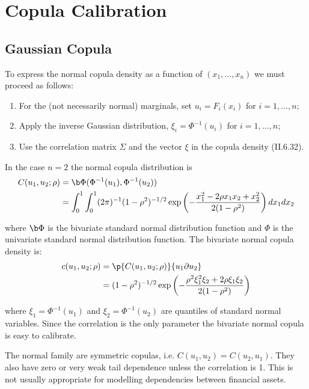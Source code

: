 \section{Copula Calibration}

\subsection{Gaussian Copula}
To express the normal copula density as a function of $(x_1, \ldots, x_n)$ we must proceed as follows:

\begin{enumerate}
    \item For the (not necessarily normal) marginals, set $u_i = F_i(x_i)$ for $i = 1, \ldots, n$;
    \item Apply the inverse Gaussian distribution, $\xi_i = \Phi^{-1}(u_i)$ for $i = 1, \ldots, n$;
    \item Use the correlation matrix $\Sigma$ and the vector $\xi$ in the copula density (II.6.32).
\end{enumerate}

In the case $n = 2$ the normal copula distribution is 
\begin{align*}
C(u_1, u_2; \rho) 
&= \b \Phi(\Phi^{-1}(u_1), \Phi^{-1}(u_2))
\\
&= \int_0^1 \int_0^1 (2\pi)^{-1}(1 - \rho^2)^{-1/2} \exp\left(-\frac{x_1^2 - 2\rho x_1 x_2 + x_2^2}{2(1 - \rho^2)}\right) dx_1 dx_2
\end{align*}

where $\b \Phi$ is the bivariate standard normal distribution function and $\Phi$ is the univariate standard normal distribution function. The bivariate normal copula density is:
\begin{align*}
c(u_1, u_2; \rho) 
&= \p{C(u_1,u_2;\rho)}{u_1 \partial u_2}
\\
&= (1 - \rho^2)^{-1/2} \exp\left(-\frac{\rho^2 \xi_1^2 \xi_2 + 2\rho \xi_1 \xi_2}{2(1 - \rho^2)}\right)
\end{align*}

where $\xi_1 = \Phi^{-1}(u_1)$ and $\xi_2 = \Phi^{-1}(u_2)$ are quantiles of standard normal variables. Since the correlation is the only parameter the bivariate normal copula is easy to calibrate.

The normal family are symmetric copulas, i.e. $C(u_1, u_2) = C(u_2, u_1)$. They also have zero or very weak tail dependence unless the correlation is 1. This is not usually appropriate for modelling dependencies between financial assets. 


